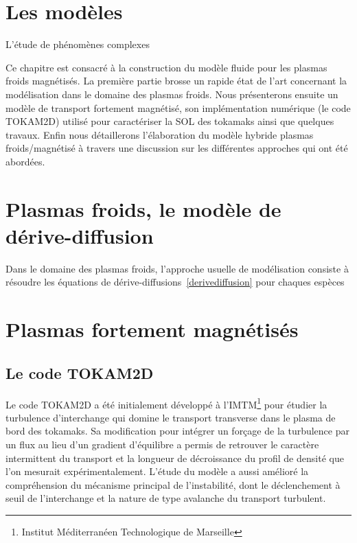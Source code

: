  	\section{Les modèles}
L'étude de phénomènes complexes
 	
Ce chapitre est consacré à la construction du modèle fluide pour les plasmas
froids magnétisés.
La première partie brosse un rapide état de l'art concernant la modélisation
dans le domaine des plasmas froids. Nous présenterons ensuite un modèle de
transport fortement magnétisé, son implémentation numérique (le code TOKAM2D)
utilisé pour caractériser la SOL des tokamaks ainsi que quelques travaux. Enfin
nous détaillerons l'élaboration du modèle hybride plasmas froids/magnétisé à
travers une discussion sur les différentes approches qui ont été abordées.
	
	\section{Plasmas froids, le modèle de dérive-diffusion}
Dans le domaine des plasmas froids, l'approche usuelle de modélisation consiste
à résoudre les équations de dérive-diffusions~\eqref{derivediffusion} pour
chaques espèces
	\section{Plasmas fortement magnétisés}
	 \subsection{Le code TOKAM2D}
Le code TOKAM2D a été initialement développé à l'IMTM\footnote{Institut
Méditerranéen Technologique de Marseille} pour étudier la turbulence
d'interchange qui domine le transport transverse dans le plasma de bord des
tokamaks. Sa modification pour intégrer un forçage de la turbulence par un flux
au lieu d'un gradient d'équilibre a permis de retrouver le caractère
intermittent du transport et la longueur de décroissance du profil de densité
que l'on mesurait expérimentalement. L'étude du modèle a aussi amélioré la
compréhension du mécanisme principal de l'instabilité, dont le déclenchement à
seuil de l'interchange et la nature de type avalanche du transport turbulent.
